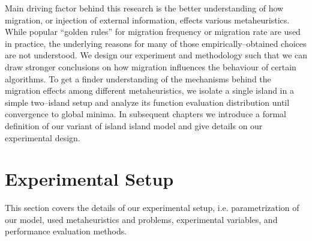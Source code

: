 \documentclass{sig-alternate}
\begin{document}
Main driving factor behind this research is the better understanding of how migration, or injection of external information, effects various metaheuristics.
While popular ``golden rules'' for migration frequency or migration rate are used in practice, the underlying reasons for many of those empirically--obtained choices are not understood.
We design our experiment and methodology such that we can draw stronger conclusions on how migration influences the behaviour of certain algorithms.
To get a finder understanding of the mechanisms behind the migration effects among different metaheuristics, we isolate a single island in a simple two--island setup and analyze its function evaluation distribution until convergence to global minima.
In subsequent chapters we introduce a formal definition of our variant of island island model and give details on our experimental design.

\section{Experimental Setup}
This section covers the details of our experimental setup, i.e. parametrization of our model, used metaheuristics and problems, experimental variables, and performance evaluation methods.
\end{document}
